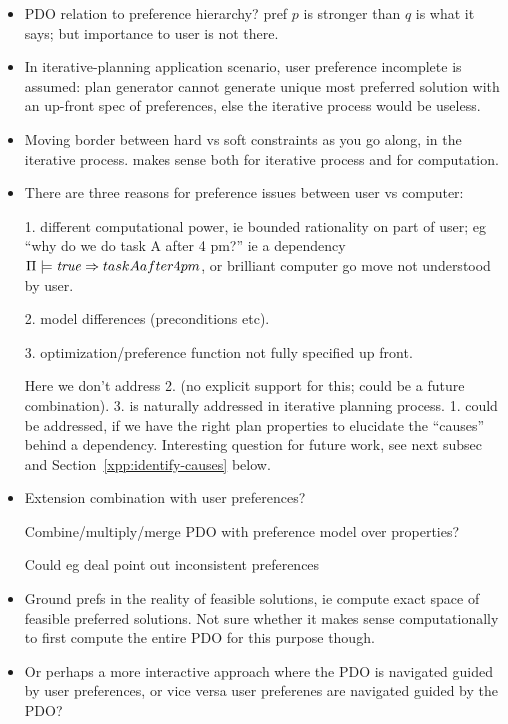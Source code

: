 \begin{itemize}
\item PDO relation to preference hierarchy? pref $p$ is stronger than
  $q$ is what it says; but importance to user is not there.

\item In iterative-planning application scenario, user preference
  incomplete is assumed: plan generator cannot generate unique most
  preferred solution with an up-front spec of preferences, else the
  iterative process would be useless.

\item Moving border between hard vs soft constraints as you go along,
  in the iterative process. makes sense both for iterative process and
  for computation.

\item There are three reasons for preference issues between user vs
  computer:

  1. different computational power, ie bounded rationality on part of
  user; eg ``why do we do task A after 4 pm?'' ie a dependency
  $\Pi \models \mathit{true} \Rightarrow taskAafter4pm$, or brilliant computer go
  move not understood by user.

  2. model differences (preconditions etc).

  3. optimization/preference function not fully specified up front.

  Here we don't address 2. (no explicit support for this; could be a
  future combination). 3. is naturally addressed in iterative planning
  process. 1. could be addressed, if we have the right plan properties
  to elucidate the ``causes'' behind a dependency. Interesting
  question for future work, see next subsec and
  Section~\ref{xpp:identify-causes} below.

\item Extension combination with user preferences?

  Combine/multiply/merge PDO with preference model over properties?

  Could eg deal point out inconsistent preferences

\item Ground prefs in the reality of feasible solutions, ie compute
  exact space of feasible preferred solutions. Not sure whether it
  makes sense computationally to first compute the entire PDO for this
  purpose though.

\item Or perhaps a more interactive approach where the PDO is
  navigated guided by user preferences, or vice versa user preferenes
  are navigated guided by the PDO?

\end{itemize}







